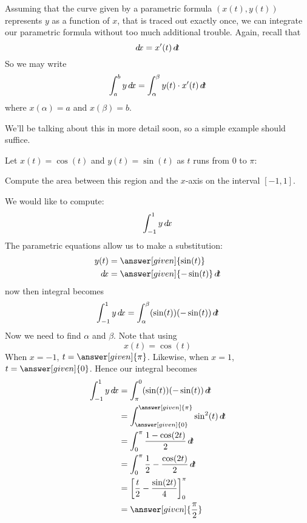\documentclass{ximera}
\begin{document}
Assuming that the curve given by a parametric formula $(x(t),y(t))$
represents $y$ as a function of $x$, that is traced out exactly once,
we can integrate our parametric formula without too much additional
trouble.  Again, recall that
\[
\mathop{}\!d\! x = x'(t) \mathop{}\!d\! t
\]
So we may write
\[
\int_a^b y \mathop{}\!d\! x = \int_\alpha^\beta y(t) \cdot x'(t) \mathop{}\!d\! t
\]
where $x(\alpha) = a$ and $x(\beta) = b$.

We'll be talking about this in more detail soon, so a simple example
should suffice.

\begin{example}
  Let $x(t) = \cos(t)$ and $y(t)= \sin(t)$ as $t$ runs from $0$ to
  $\pi$:
  \begin{image}
  \end{image}
  Compute the area between this region and the $x$-axis on the
  interval $[-1,1]$.
  \begin{explanation}
    We would like to compute:
    \[
    \int_{-1}^1 y \mathop{}\!d\! x
    \]
    The parametric equations allow us to make a substitution: 
    \begin{align*}
      y(t) &=\answer[given]{\sin(t)}\\
      \d x &=\answer[given]{-\sin(t)}\d t
    \end{align*}
    now then integral becomes
    \[
    \int_{-1}^{1} y \mathop{}\!d\! x= \int_\alpha^\beta (\sin(t))(-\sin(t))\mathop{}\!d\! t
    \]
    Now we need to find $\alpha$ and $\beta$. Note that using
    \[
    x(t)=\cos(t)
    \]
    When $x=-1$, $t=\answer[given]{\pi}$. Likewise, when $x=1$, $t=\answer[given]{0}$. Hence our
    integral becomes
    \begin{align*}
      \int_{-1}^{1} y \d x&= \int_\pi^0 (\sin(t))(-\sin(t))\d t\\
      &= \int_{\answer[given]{0}}^{\answer[given]{\pi}}\sin^2(t)\d t\\
      &= \int_0^\pi\frac{1-\cos(2t)}{2}\d t\\
      &= \int_0^\pi\frac{1}{2}-\frac{\cos(2t)}{2}\d t\\
      &= \eval{\frac{t}{2}-\frac{\sin(2t)}{4}}_0^\pi\\
      &= \answer[given]{\frac{\pi}{2}}
    \end{align*}
  \end{explanation}
\end{example}
\end{document}
